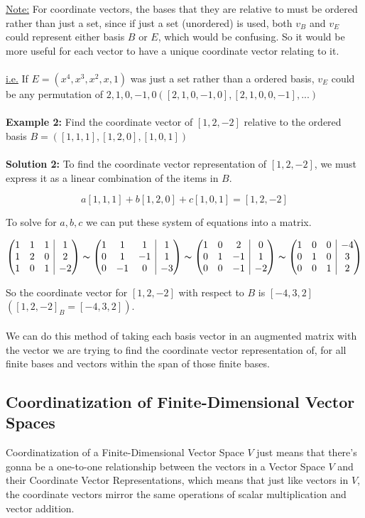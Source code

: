 \documentclass[12pt]{article}
\makeatletter
\newenvironment{amatrix}[1]{%
  \left(\begin{array}{@{}*{#1}{c}|c@{}}
}{%
  \end{array}\right)
}
\makeatother
\begin{document}
\underline{Note:} For coordinate vectors, the bases that they are relative to must be ordered rather than just a set, since if just a set (unordered) is used, both $v_B$ and $v_E$ could represent either basis $B$ or $E$, which would be confusing. So it would be more useful for each vector to have a unique coordinate vector relating to it.\\
\\
\underline{i.e.} If $E = (x^4, x^3, x^2, x, 1)$ was just a set rather than a ordered basis, $v_E$ could be any permutation of $2,1,0,-1,0 ([2,1,0,-1,0], [2,1,0,0,-1],...)$\\
\\
\textbf{Example 2:} Find the coordinate vector of $[1,2,-2]$ relative to the ordered basis $B = ([1,1,1], [1,2,0], [1,0,1])$\\
\\
\textbf{Solution 2:} To find the coordinate vector representation of $[1,2,-2]$, we must express it as a linear combination of the items in $B$.

$$a[1,1,1] + b[1,2,0] + c[1,0,1] = [1,2,-2]$$

To solve for $a,b,c$ we can put these system of equations into a matrix.

$$
\begin{amatrix}{3}
1 & 1 & 1 & 1 \\
1 & 2 & 0 & 2 \\
1 & 0 & 1 & -2
\end{amatrix} 
\thicksim
\begin{amatrix}{3}
1 & 1 & 1 & 1 \\
0 & 1 & -1 & 1 \\
0 & -1 & 0 & -3
\end{amatrix} 
\thicksim
\begin{amatrix}{3}
1 & 0 & 2 & 0 \\
0 & 1 & -1 & 1 \\
0 & 0 & -1 & -2
\end{amatrix}
\thicksim
\begin{amatrix}{3}
1 & 0 & 0 & -4 \\
0 & 1 & 0 & 3 \\
0 & 0 & 1 & 2
\end{amatrix}
$$

So the coordinate vector for $[1,2,-2]$ with respect to $B$ is $[-4,3,2]$ $([1,2,-2]_B = [-4,3,2])$.\\
\\
We can do this method of taking each basis vector in an augmented matrix with the vector we are trying to find the coordinate vector representation of, for all finite bases and vectors within the span of those finite bases.
\subsection{Coordinatization of Finite-Dimensional Vector Spaces}

Coordinatization of a Finite-Dimensional Vector Space $V$ just means that there's gonna be a one-to-one relationship between the vectors in a Vector Space $V$ and their Coordinate Vector Representations, which means that just like vectors in $V$, the coordinate vectors mirror the same operations of scalar multiplication and vector addition.
\end{document}

